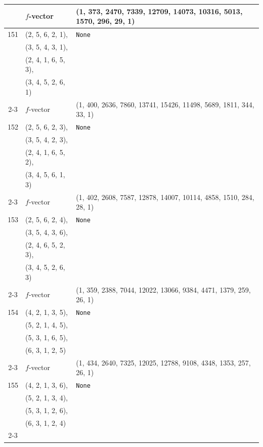 \documentclass[10pt]{amsart}
\numberwithin{equation}{section}
\theoremstyle{plain}
\theoremstyle{definition}
\theoremstyle{remark}
\begin{document}
{\begin{longtable}{c|l|l}
		& $f$-vector & {(1, 373, 2470, 7339, 12709, 14073, 10316, 5013, 1570, 296, 29, 1)} \\
		\midrule
		
		151 & (2, 5, 6, 2, 1), & \texttt{None} \\
		& (3, 5, 4, 3, 1), &  \\
		& (2, 4, 1, 6, 5, 3), &  \\
		& (3, 4, 5, 2, 6, 1) &  \\ \cline{2-3}
		
		& $f$-vector & {(1, 400, 2636, 7860, 13741, 15426, 11498, 5689, 1811, 344, 33, 1)} \\
		\midrule
		
		152 & (2, 5, 6, 2, 3), & \texttt{None} \\
		& (3, 5, 4, 2, 3), &  \\
		& (2, 4, 1, 6, 5, 2), &  \\
		& (3, 4, 5, 6, 1, 3) &  \\ \cline{2-3}
		
		& $f$-vector & {(1, 402, 2608, 7587, 12878, 14007, 10114, 4858, 1510, 284, 28, 1)} \\
		\midrule
		
		153 & (2, 5, 6, 2, 4), & \texttt{None} \\
		& (3, 5, 4, 3, 6), &  \\
		& (2, 4, 6, 5, 2, 3), &  \\
		& (3, 4, 5, 2, 6, 3) &  \\ \cline{2-3}
		
		& $f$-vector & {(1, 359, 2388, 7044, 12022, 13066, 9384, 4471, 1379, 259, 26, 1)} \\
		\midrule
		
		154 & (4, 2, 1, 3, 5), & \texttt{None} \\
		& (5, 2, 1, 4, 5), &  \\
		& (5, 3, 1, 6, 5), &  \\
		& (6, 3, 1, 2, 5) &  \\ \cline{2-3}
		
		& $f$-vector & {(1, 434, 2640, 7325, 12025, 12788, 9108, 4348, 1353, 257, 26, 1)} \\
		\midrule
		
		155 & (4, 2, 1, 3, 6), & \texttt{None} \\
		& (5, 2, 1, 3, 4), &  \\
		& (5, 3, 1, 2, 6), &  \\
		& (6, 3, 1, 2, 4) &  \\ \cline{2-3}
		

\end{longtable}}
\end{document}
